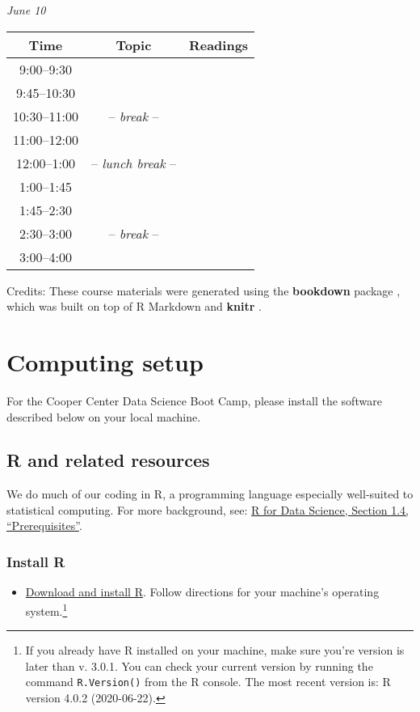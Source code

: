 \documentclass[
]{book}
\providecommand{\tightlist}{%
  \setlength{\itemsep}{0pt}\setlength{\parskip}{0pt}}
\begin{document}
\emph{June 10}

\begin{longtable}[]{@{}ccl@{}}
\toprule
Time & Topic & Readings\tabularnewline
\midrule
\endhead
9:00--9:30 & &\tabularnewline
9:45--10:30 & &\tabularnewline
10:30--11:00 & -- \emph{break} -- &\tabularnewline
11:00--12:00 & &\tabularnewline
12:00--1:00 & -- \emph{lunch break} -- &\tabularnewline
1:00--1:45 & &\tabularnewline
1:45--2:30 & &\tabularnewline
2:30--3:00 & -- \emph{break} -- &\tabularnewline
3:00--4:00 & &\tabularnewline
\bottomrule
\end{longtable}

Credits: These course materials were generated using the \textbf{bookdown} package \citep{R-bookdown}, which was built on top of R Markdown and \textbf{knitr} \citep{xie2015}.

\hypertarget{computing-setup}{%
\chapter{Computing setup}\label{computing-setup}}

For the Cooper Center Data Science Boot Camp, please install the software described below on your local machine.

\hypertarget{r-and-related-resources}{%
\section{R and related resources}\label{r-and-related-resources}}

We do much of our coding in R, a programming language especially well-suited to statistical computing. For more background, see: \href{https://r4ds.had.co.nz/introduction.html\#prerequisites}{R for Data Science, Section 1.4, ``Prerequisites''}.

\hypertarget{install-r}{%
\subsection{Install R}\label{install-r}}

\begin{itemize}
\tightlist
\item
  \href{https://cran.rstudio.com/}{Download and install R}. Follow directions for your machine's operating system.\footnote{If you already have R installed on your machine, make sure you're version is later than v. 3.0.1. You can check your current version by running the command \texttt{R.Version()} from the R console. The most recent version is: R version 4.0.2 (2020-06-22).}
\end{itemize}
\end{document}
